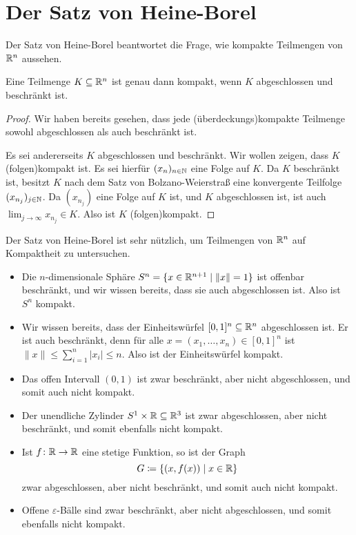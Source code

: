 \documentclass[a4paper,10pt]{article}
\begin{document}
\section{Der Satz von Heine-Borel}
Der Satz von Heine-Borel beantwortet die Frage, wie kompakte Teilmengen von $\mathbb{R}^n$ aussehen.


\begin{thrm}
 Eine Teilmenge $K \subseteq \mathbb{R}^n$ ist genau dann kompakt, wenn $K$ abgeschlossen und beschränkt ist.
\end{thrm}
\begin{proof}
 Wir haben bereits gesehen, dass jede (überdeckungs)kompakte Teilmenge sowohl abgeschlossen als auch beschränkt ist.
 
 Es sei andererseits $K$ abgeschlossen und beschränkt. Wir wollen zeigen, dass $K$ (folgen)kompakt ist. Es sei hierfür $(x_n)_{n \in \mathbb{N}}$ eine Folge auf $K$. Da $K$ beschränkt ist, besitzt $K$ nach dem Satz von Bolzano-Weierstraß eine konvergente Teilfolge $(x_{n_j})_{j \in \mathbb{N}}$. Da $(x_{n_j})$ eine Folge auf $K$ ist, und $K$ abgeschlossen ist, ist auch $\lim_{j \to \infty} x_{n_j} \in K$. Also ist $K$ (folgen)kompakt.
\end{proof}


Der Satz von Heine-Borel ist sehr nützlich, um Teilmengen von $\mathbb{R}^n$ auf Kompaktheit zu untersuchen.


\begin{bsp}
 \begin{itemize}
  \item
   Die $n$-dimensionale Sphäre $S^n = \{x \in \mathbb{R}^{n+1} \mid \|x\| = 1\}$ ist offenbar beschränkt, und wir wissen bereits, dass sie auch abgeschlossen ist. Also ist $S^n$ kompakt.
  \item
   Wir wissen bereits, dass der Einheitswürfel $[0,1]^n \subseteq \mathbb{R}^n$ abgeschlossen ist. Er ist auch beschränkt, denn für alle $x = (x_1, \dotsc, x_n) \in [0,1]^n$ ist $\|x\| \leq \sum_{i=1}^n |x_i| \leq n$. Also ist der Einheitswürfel kompakt.
  \item
   Das offen Intervall $(0,1)$ ist zwar beschränkt, aber nicht abgeschlossen, und somit auch nicht kompakt.
  \item
   Der unendliche Zylinder $S^1 \times \mathbb{R} \subseteq \mathbb{R}^3$ ist zwar abgeschlossen, aber nicht beschränkt, und somit ebenfalls nicht kompakt.
  \item
   Ist $f \colon \mathbb{R} \to \mathbb{R}$ eine stetige Funktion, so ist der Graph
   \[
    G \coloneqq \{(x,f(x)) \mid x \in \mathbb{R}\}
   \]
   zwar abgeschlossen, aber nicht beschränkt, und somit auch nicht kompakt.
  \item
   Offene $\varepsilon$-Bälle sind zwar beschränkt, aber nicht abgeschlossen, und somit ebenfalls nicht kompakt.
  \end{itemize}
\end{bsp}
\end{document}

